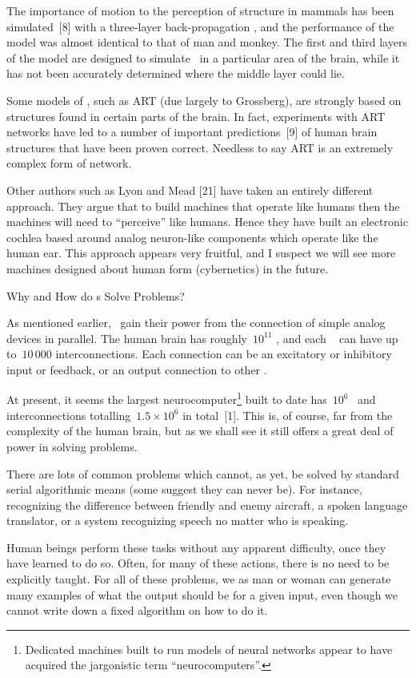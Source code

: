 The importance of motion to the perception of structure in mammals has
been simulated~[8] with a three-layer back-propagation \nn, and the
performance of the model was almost identical to that of man and monkey.
The first and third layers of the model are designed to simulate 
\neus\ in a particular area of the brain, while it has not been accurately
determined where the middle layer could lie. 

Some models of \nns, such as ART (due largely to Grossberg), are strongly 
based on structures found in certain parts of the brain. 
In fact, experiments with ART networks have led to a number of important
predictions~[9] of human brain structures that have been proven correct.
Needless to say ART is an extremely complex form of network.

Other authors such as Lyon and Mead [21] have taken an entirely different
approach.
They argue that to build machines that operate like humans then the
machines will need to ``perceive'' like humans.
Hence they have built an electronic cochlea based around analog
neuron-like components which operate like the human ear.
This approach appears very fruitful, and I suspect we will see more
machines designed about human form (cybernetics) in the future.

\sec Why and How do \NN s Solve Problems?

As mentioned earlier, \nns\ gain their power from the connection of
simple analog devices in parallel.
The human brain has roughly~$10^{11}$ \neus, and each \neu\ %
can have up to~$10\,000$ interconnections.
Each connection can be an excitatory or inhibitory input or feedback, or
an output connection to other \neus.

At present, it seems the largest neurocomputer\footnote*{Dedicated
machines built to run models of neural networks appear to have acquired
the jargonistic term ``neurocomputers''.} built to date has~$10^6$
\neus\ and interconnections totalling~$1.5\times10^6$ in total~[1].
This is, of course, far from the complexity of the human brain, but as
we shall see it still offers a great deal of power in solving problems.

There are lots of common problems which cannot, as yet, be solved  by
standard serial algorithmic means (some suggest they can never be).
For instance, recognizing the difference between friendly and enemy
aircraft, a spoken language translator, or a system recognizing speech
no matter who is speaking.

Human beings perform these tasks without any apparent difficulty, once
they have learned to do so.
Often, for many of these actions, there is no need to be explicitly taught.
For all of these problems, we as man or woman can generate many examples 
of what the
output should be for a given input, even though we cannot write down a
fixed algorithm on how to do it.

